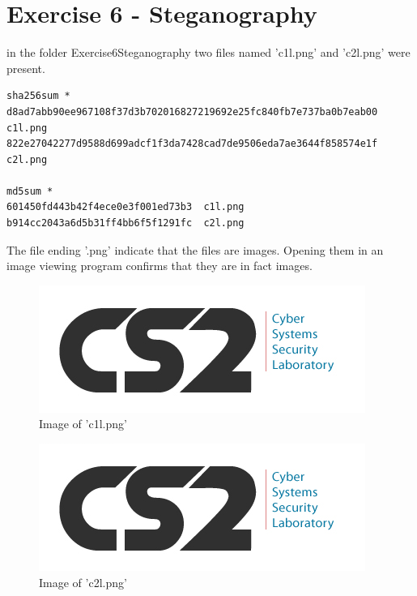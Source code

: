 \documentclass[a4paper,10pt,oneside]{article}
\begin{document}
\section{Exercise 6 - Steganography}
in the folder Exercise6\textunderscore Steganography two files named 'c1l.png' and 'c2l.png' were present.

\begin{lstlisting}[caption= SHA256 and MD5 sum of files in Exercise6\textunderscore Steganography]
sha256sum *
d8ad7abb90ee967108f37d3b702016827219692e25fc840fb7e737ba0b7eab00  c1l.png
822e27042277d9588d699adcf1f3da7428cad7de9506eda7ae3644f858574e1f  c2l.png

md5sum *
601450fd443b42f4ece0e3f001ed73b3  c1l.png
b914cc2043a6d5b31ff4bb6f5f1291fc  c2l.png
\end{lstlisting}

The file ending '.png' indicate that the files are images. Opening them in an image viewing program confirms that they are in fact images.

\begin{figure}[ht]
  \includegraphics[width=\textwidth]{images/c1l}
  \caption{Image of 'c1l.png'}
  \centering
\end{figure}





\begin{figure}[ht]
  \includegraphics[width=\textwidth]{images/c2l}
  \caption{Image of 'c2l.png'}
  \centering
\end{figure}
\end{document}
